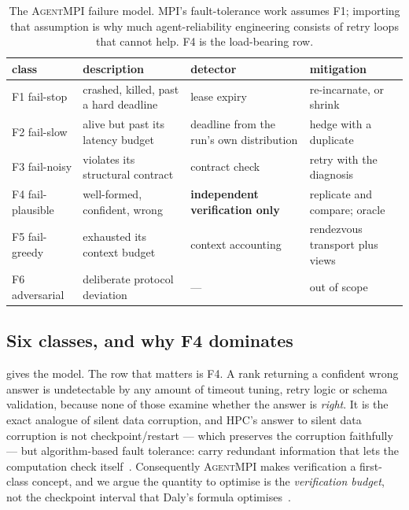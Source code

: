 \documentclass[10pt,twocolumn]{article}
\theoremstyle{definition}
\theoremstyle{plain}
\newcommand{\ampi}{\textsc{AgentMPI}}
\begin{document}
\begin{table}[t]
\centering\small
\begin{tabular}{llll}
\toprule
class & description & detector & mitigation \\
\midrule
F1 fail-stop & crashed, killed, past a hard deadline & lease expiry & re-incarnate, or shrink \\
F2 fail-slow & alive but past its latency budget & deadline from the run's own distribution & hedge with a duplicate \\
F3 fail-noisy & violates its structural contract & contract check & retry with the diagnosis \\
F4 fail-plausible & well-formed, confident, wrong & \textbf{independent verification only} & replicate and compare; oracle \\
F5 fail-greedy & exhausted its context budget & context accounting & rendezvous transport plus views \\
F6 adversarial & deliberate protocol deviation & --- & out of scope \\
\bottomrule
\end{tabular}
\caption{The \ampi{} failure model. MPI's fault-tolerance work assumes F1;
importing that assumption is why much agent-reliability engineering consists of
retry loops that cannot help. F4 is the load-bearing row.}
\label{tab:failures}
\end{table}

\subsection{Six classes, and why F4 dominates}

 gives the model. The row that matters is F4. A rank returning a
confident wrong answer is undetectable by any amount of timeout tuning, retry logic
or schema validation, because none of those examine whether the answer is
\emph{right}. It is the exact analogue of silent data corruption, and HPC's answer
to silent data corruption is not checkpoint/restart --- which preserves the
corruption faithfully --- but algorithm-based fault tolerance: carry redundant
information that lets the computation check
itself~\cite{huang84abft}. Consequently \ampi{} makes verification a first-class
concept, and we argue the quantity to optimise is the \emph{verification budget},
not the checkpoint interval that Daly's formula
optimises~\cite{daly06checkpoint}.
\end{document}
